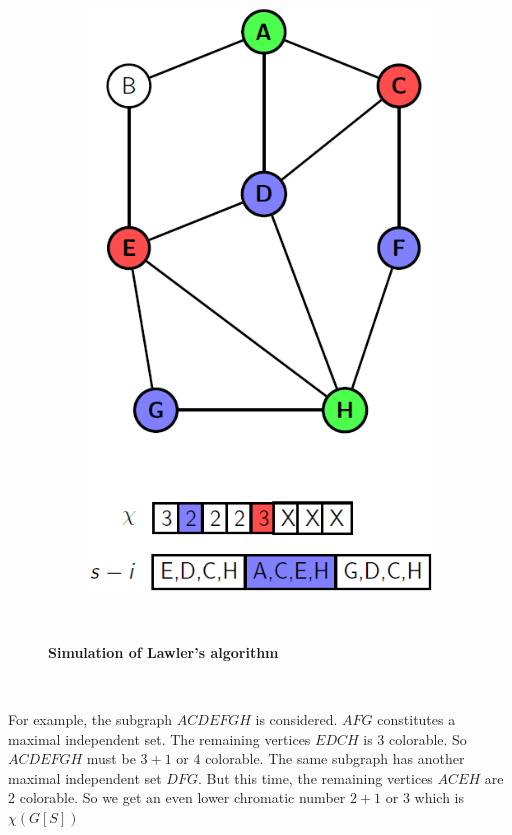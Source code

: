 \documentclass[14pt]{extreport}
\begin{document}
\begin{figure}[t]
\begin{subfigure}[t]{0.45\textwidth}
            \includegraphics[width=0.9\linewidth]{diagrams/dp2.PNG}
            \subcaption{}
        \end{subfigure}
        \caption{\textbf{Simulation of Lawler's algorithm}}\
        \label{fig:1}
    \end{figure}\
    
    For example, the subgraph $ACDEFGH$ is considered. $AFG$ constitutes a maximal independent set. The remaining vertices $EDCH$ is 3 colorable. So $ACDEFGH$ must be $3+1$ or $4$ colorable. The same subgraph has another maximal independent set $DFG$. But this time, the remaining vertices $ACEH$ are 2 colorable. So we get an even lower chromatic number $2+1$ or $3$ which is $\chi(G[S])$
    
    \pagebreak
	
\end{document}
